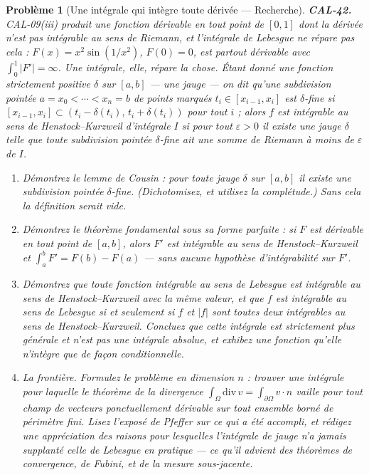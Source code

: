 \documentclass[11pt]{article}
\newtheorem{problem}{Problème}
\begin{document}
\begin{problem}[{Une intégrale qui intègre toute dérivée --- Recherche}]
\textbf{CAL-42.} CAL-09(iii) produit une fonction dérivable en tout point de $ [0,1] $
dont la dérivée n'est pas intégrable au sens de Riemann, et l'intégrale de Lebesgue ne répare pas cela :
$ F(x) = x^2\sin(1/x^2) $, $ F(0)=0 $, est partout dérivable avec
$ \int_0^1 |F'| = \infty $. Une intégrale, elle, répare la chose. Étant donné une fonction strictement positive
$ \delta $ sur $ [a,b] $ --- une \textit{jauge} --- on dit qu'une subdivision pointée
$ a = x_0 < \cdots < x_n = b $ de points marqués $ t_i \in [x_{i-1},x_i] $ est \textit{$ \delta $-fine}
si $ [x_{i-1},x_i] \subset (t_i-\delta(t_i),\, t_i+\delta(t_i)) $ pour tout $ i $ ; alors $ f $
est intégrable au sens de Henstock--Kurzweil d'intégrale $ I $ si pour tout $ \varepsilon > 0 $
il existe une jauge $ \delta $ telle que toute subdivision pointée $ \delta $-fine ait une somme de Riemann
à moins de $ \varepsilon $ de $ I $.
\begin{enumerate}
\item[(a)] Démontrez le lemme de Cousin : pour toute jauge $ \delta $ sur $ [a,b] $ il existe une subdivision
pointée $ \delta $-fine. (Dichotomisez, et utilisez la complétude.) Sans cela la définition serait
vide.
\item[(b)] Démontrez le théorème fondamental sous sa forme parfaite : si $ F $ est dérivable en tout
point de $ [a,b] $, alors $ F' $ est intégrable au sens de Henstock--Kurzweil et
$ \int_a^b F' = F(b)-F(a) $ --- sans aucune hypothèse d'intégrabilité sur $ F' $.
\item[(c)] Démontrez que toute fonction intégrable au sens de Lebesgue est intégrable au sens de Henstock--Kurzweil avec la
même valeur, et que $ f $ est intégrable au sens de Lebesgue si et seulement si $ f $ et $ |f| $ sont toutes deux
intégrables au sens de Henstock--Kurzweil. Concluez que cette intégrale est strictement plus générale et n'est
pas une intégrale absolue, et exhibez une fonction qu'elle n'intègre que de façon conditionnelle.
\item[(d)] La frontière. Formulez le problème en dimension $ n $ : trouver une intégrale pour laquelle le
théorème de la divergence $ \int_{\Omega} \mathrm{div}\, v = \int_{\partial\Omega} v\cdot n $ vaille pour
tout champ de vecteurs ponctuellement dérivable sur tout ensemble borné de périmètre fini. Lisez
l'exposé de Pfeffer sur ce qui a été accompli, et rédigez une appréciation des raisons pour lesquelles l'intégrale
de jauge n'a jamais supplanté celle de Lebesgue en pratique --- ce qu'il advient des théorèmes de
convergence, de Fubini, et de la mesure sous-jacente.
\end{enumerate}

\end{problem}
\end{document}
